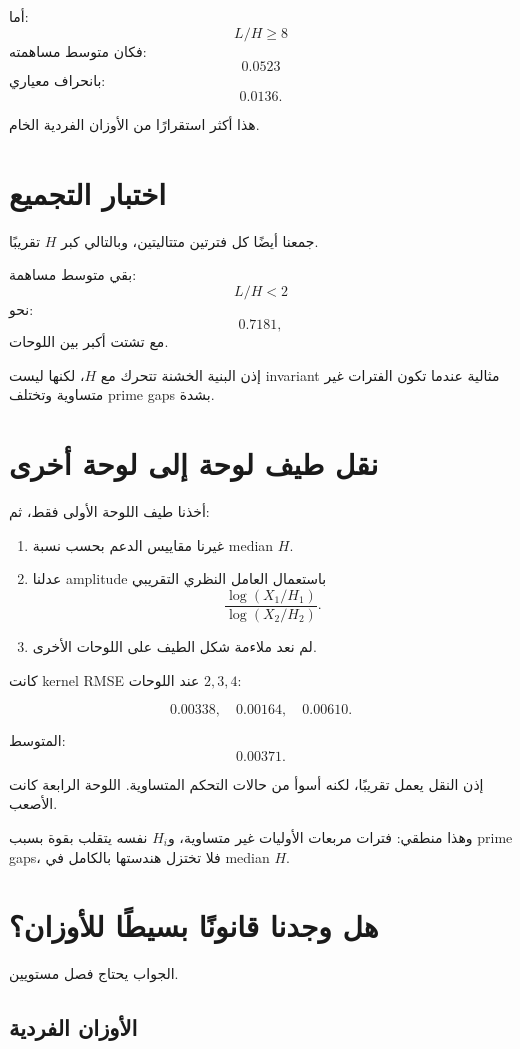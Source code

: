 \documentclass[12pt]{article}
\begin{document}
أما:
\[
L/H\ge8
\]
فكان متوسط مساهمته:
\[
0.0523
\]
بانحراف معياري:
\[
0.0136.
\]

هذا أكثر استقرارًا من الأوزان الفردية الخام.

\section{اختبار التجميع}

جمعنا أيضًا كل فترتين متتاليتين، وبالتالي كبر \(H\) تقريبًا.

بقي متوسط مساهمة:
\[
L/H<2
\]
نحو:
\[
0.7181,
\]
مع تشتت أكبر بين اللوحات.

إذن البنية الخشنة تتحرك مع \(H\)، لكنها ليست invariant مثالية عندما
تكون الفترات غير متساوية وتختلف prime gaps بشدة.

\section{نقل طيف لوحة إلى لوحة أخرى}

أخذنا طيف اللوحة الأولى فقط، ثم:

\begin{enumerate}
\item غيرنا مقاييس الدعم بحسب نسبة median \(H\).
\item عدلنا amplitude باستعمال العامل النظري التقريبي
\[
\frac{\log(X_1/H_1)}{\log(X_2/H_2)}.
\]
\item لم نعد ملاءمة شكل الطيف على اللوحات الأخرى.
\end{enumerate}

كانت kernel RMSE عند اللوحات \(2,3,4\):

\[
0.00338,\quad0.00164,\quad0.00610.
\]

المتوسط:
\[
\boxed{0.00371}.
\]

إذن النقل يعمل تقريبًا، لكنه أسوأ من حالات التحكم المتساوية.
اللوحة الرابعة كانت الأصعب.

وهذا منطقي: فترات مربعات الأوليات غير متساوية، و\(H_i\) نفسه يتقلب
بقوة بسبب prime gaps، فلا تختزل هندستها بالكامل في median \(H\).

\section{هل وجدنا قانونًا بسيطًا للأوزان؟}

الجواب يحتاج فصل مستويين.

\subsection{الأوزان الفردية}
\end{document}
